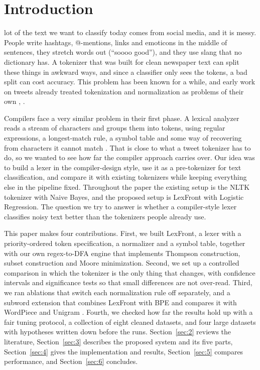 \documentclass{ieeeaccess}
\begin{document}
\section{Introduction}\label{sec:1}
 lot of the text we want to classify today comes from social media, and it is messy. People write hashtags, @-mentions, links and emoticons in the middle of sentences, they stretch words out (``soooo good''), and they use slang that no dictionary has. A tokenizer that was built for clean newspaper text can split these things in awkward ways, and since a classifier only sees the tokens, a bad split can cost accuracy. This problem has been known for a while, and early work on tweets already treated tokenization and normalization as problems of their own \cite{r2}, \cite{r3}.

Compilers face a very similar problem in their first phase. A lexical analyzer reads a stream of characters and groups them into tokens, using regular expressions, a longest-match rule, a symbol table and some way of recovering from characters it cannot match \cite{r1}. That is close to what a tweet tokenizer has to do, so we wanted to see how far the compiler approach carries over. Our idea was to build a lexer in the compiler-design style, use it as a pre-tokenizer for text classification, and compare it with existing tokenizers while keeping everything else in the pipeline fixed. Throughout the paper the existing setup is the NLTK tokenizer with Naive Bayes, and the proposed setup is LexFront with Logistic Regression. The question we try to answer is whether a compiler-style lexer classifies noisy text better than the tokenizers people already use.

This paper makes four contributions. First, we built LexFront, a lexer with a priority-ordered token specification, a normalizer and a symbol table, together with our own regex-to-DFA engine that implements Thompson construction, subset construction and Moore minimization. Second, we set up a controlled comparison in which the tokenizer is the only thing that changes, with confidence intervals and significance tests so that small differences are not over-read. Third, we ran ablations that switch each normalization rule off separately, and a subword extension that combines LexFront with BPE and compares it with WordPiece and Unigram \cite{r4}. Fourth, we checked how far the results hold up with a fair tuning protocol, a collection of eight cleaned datasets, and four large datasets with hypotheses written down before the runs. Section~\ref{sec:2} reviews the literature, Section~\ref{sec:3} describes the proposed system and its five parts, Section~\ref{sec:4} gives the implementation and results, Section~\ref{sec:5} compares performance, and Section~\ref{sec:6} concludes.
\end{document}
